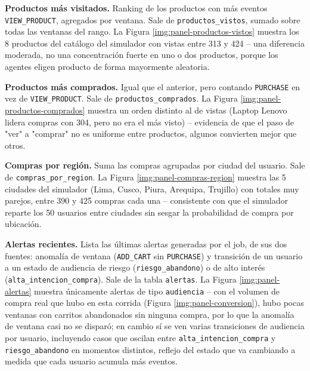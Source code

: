 
\textbf{Productos más visitados.} Ranking de los productos con más eventos \texttt{VIEW\_PRODUCT}, agregados por ventana. Sale de \texttt{productos\_vistos}, sumado sobre todas las ventanas del rango. La Figura \ref{img:panel-productos-vistos} muestra los 8 productos del catálogo del simulador con vistas entre 313 y 424 -- una diferencia moderada, no una concentración fuerte en uno o dos productos, porque los agentes eligen producto de forma mayormente aleatoria.


\textbf{Productos más comprados.} Igual que el anterior, pero contando \texttt{PURCHASE} en vez de \texttt{VIEW\_PRODUCT}. Sale de \texttt{productos\_comprados}. La Figura \ref{img:panel-productos-comprados} muestra un orden distinto al de vistas (Laptop Lenovo lidera compras con 304, pero no era el más visto) -- evidencia de que el paso de "ver" a "comprar" no es uniforme entre productos, algunos convierten mejor que otros.


\textbf{Compras por región.} Suma las compras agrupadas por ciudad del usuario. Sale de \texttt{compras\_por\_region}. La Figura \ref{img:panel-compras-region} muestra las 5 ciudades del simulador (Lima, Cusco, Piura, Arequipa, Trujillo) con totales muy parejos, entre 390 y 425 compras cada una -- consistente con que el simulador reparte los 50 usuarios entre ciudades sin sesgar la probabilidad de compra por ubicación.


\textbf{Alertas recientes.} Lista las últimas alertas generadas por el job, de sus dos fuentes: anomalía de ventana (\texttt{ADD\_CART} sin \texttt{PURCHASE}) y transición de un usuario a un estado de audiencia de riesgo (\texttt{riesgo\_abandono}) o de alto interés (\texttt{alta\_intencion\_compra}). Sale de la tabla \texttt{alertas}. La Figura \ref{img:panel-alertas} muestra únicamente alertas de tipo \texttt{audiencia} -- con el volumen de compra real que hubo en esta corrida (Figura \ref{img:panel-conversion}), hubo pocas ventanas con carritos abandonados sin ninguna compra, por lo que la anomalía de ventana casi no se disparó; en cambio sí se ven varias transiciones de audiencia por usuario, incluyendo casos que oscilan entre \texttt{alta\_intencion\_compra} y \texttt{riesgo\_abandono} en momentos distintos, reflejo del estado que va cambiando a medida que cada usuario acumula más eventos.


